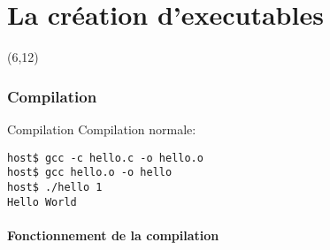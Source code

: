 %
%
%

\part{La création d'executables}

{
\begin{frame}[plain]
  \partpage
  \begin{textblock}{10}(6,12)
    \begin{quote}
      \rmfamily\textit\textbf\color{darkgray}{\large
      ``There are only 10 kinds of people in this world: those who know binary and those who don't.''}
    \end{quote}
  \end{textblock}
\end{frame}
}

\begin{frame}
  \tableofcontents
\end{frame}

\section{Compilation}

\begin{frame}[fragile=singleslide]{Compilation}
  Compilation normale:
  \begin{lstlisting}
host$ gcc -c hello.c -o hello.o
host$ gcc hello.o -o hello
host$ ./hello 1
Hello World
  \end{lstlisting} %
\end{frame}

\subsection{Fonctionnement de la compilation}

